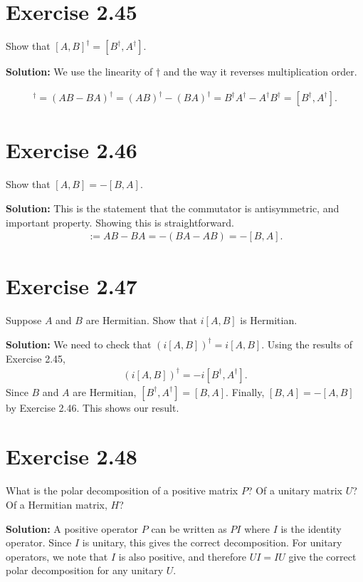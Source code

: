 \documentclass{book}
\begin{document}
\section*{Exercise 2.45}
    Show that $[A, B]^\dagger = [B^\dagger, A^\dagger]$.
    
    \textbf{Solution:} We use the linearity of $\dagger$ and the way it reverses multiplication order.
    
    \begin{align}
        [A,B]^\dagger = (AB-BA)^\dagger = (AB)^\dagger - (BA)^\dagger = B^\dagger A^\dagger - A^\dagger B^\dagger = [B^\dagger, A^\dagger].
    \end{align}
    
\section*{Exercise 2.46}
    Show that $[A, B] = -[B, A]$.
    
    \textbf{Solution:} This is the statement that the commutator is antisymmetric, and important property. Showing this is straightforward.
    \begin{align}
        [A,B] :=AB - BA = -(BA-AB) = -[B,A].
    \end{align}
    
\section*{Exercise 2.47}
    Suppose $A$ and $B$ are Hermitian. Show that $i[A, B]$ is Hermitian.
    
    \textbf{Solution:} We need to check that $(i[A,B])^\dagger = i[A,B]$. Using the results of Exercise 2.45,
    \begin{align}
        (i[A,B])^\dagger = -i [B^\dagger, A^\dagger].
    \end{align}
    Since $B$ and $A$ are Hermitian, $[B^\dagger, A^\dagger] = [B,A]$. Finally, $[B,A] = -[A,B]$ by Exercise 2.46. This shows our result.
    
\section*{Exercise 2.48}
    What is the polar decomposition of a positive matrix $P$? Of a unitary matrix $U$? Of a Hermitian matrix, $H$?
    
    \textbf{Solution:} A positive operator $P$ can be written as $P I$ where $I$ is the identity operator. Since $I$ is unitary, this gives the correct decomposition. For unitary operators, we note that $I$ is also positive, and therefore $U I = I U$ give the correct polar decomposition for any unitary $U$. 
    
\end{document}
